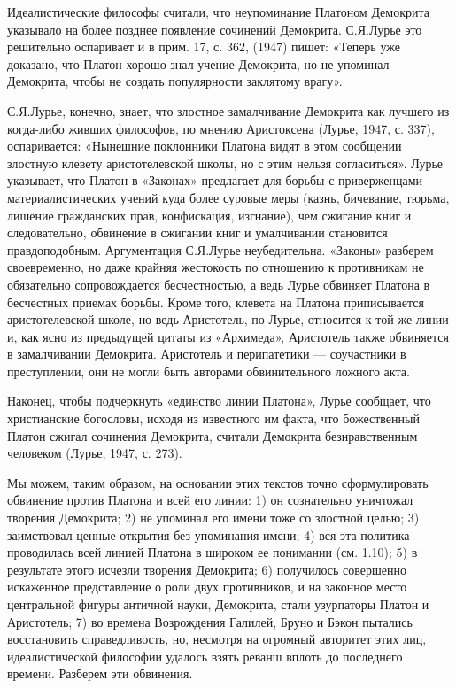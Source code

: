 Идеалистические философы считали, что неупоминание Платоном Демокрита
указывало на более позднее появление сочинений Демокрита. С.Я.Лурье
это решительно оспаривает и в прим. 17, с. 362, (1947) пишет: «Теперь
уже доказано, что Платон хорошо знал учение Демокрита, но не упоминал
Демокрита, чтобы не создать популярности заклятому врагу».

С.Я.Лурье, конечно, знает, что злостное замалчивание Демокрита как
лучшего из когда-либо живших философов, по мнению Аристоксена (Лурье,
1947, с. 337), оспаривается: «Нынешние поклонники Платона видят в этом
сообщении злостную клевету аристотелевской школы, но с этим нельзя
согласиться». Лурье указывает, что Платон в «Законах» предлагает для
борьбы с приверженцами материалистических учений куда более суровые
меры (казнь, бичевание, тюрьма, лишение гражданских прав, конфискация,
изгнание), чем сжигание книг и, следовательно, обвинение в сжигании
книг и умалчивании становится правдоподобным. Аргументация С.Я.Лурье
неубедительна. «Законы» разберем своевременно, но даже крайняя
жестокость по отношению к противникам не обязательно сопровождается
бесчестностью, а ведь Лурье обвиняет Платона в бесчестных приемах
борьбы. Кроме того, клевета на Платона приписывается аристотелевской
школе, но ведь Аристотель, по Лурье, относится к той же линии и, как
ясно из предыдущей цитаты из «Архимеда», Аристотель также обвиняется в
замалчивании Демокрита. Аристотель и перипатетики --- соучастники в
преступлении, они не могли быть авторами обвинительного ложного акта.

Наконец, чтобы подчеркнуть «единство линии Платона», Лурье сообщает,
что христианские богословы, исходя из известного им факта, что
божественный Платон сжигал сочинения Демокрита, считали Демокрита
безнравственным человеком (Лурье, 1947, с. 273).

Мы можем, таким образом, на основании этих текстов точно
сформулировать обвинение против Платона и всей его линии: 1) он
сознательно уничтожал творения Демокрита; 2) не упоминал его имени
тоже со злостной целью; 3) заимствовал ценные открытия без упоминания
имени; 4) вся эта политика проводилась всей линией Платона в широком
ее понимании (см. 1.10); 5) в результате этого исчезли творения
Демокрита; 6) получилось совершенно искаженное представление о роли
двух противников, и на законное место центральной фигуры античной
науки, Демокрита, стали узурпаторы Платон и Аристотель; 7) во времена
Возрождения Галилей, Бруно и Бэкон пытались восстановить
справедливость, но, несмотря на огромный авторитет этих лиц,
идеалистической философии удалось взять реванш вплоть до последнего
времени. Разберем эти обвинения.

